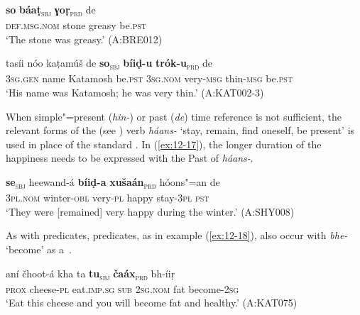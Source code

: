 \begin{exe}
\ex
\label{ex:12-15}
\gll {\ob}\textbf{so} \textbf{báaṭ}{\cb}\textsubscript{\textsc{\upshape sbj}} {\ob}\textbf{ɣoṛ}{\cb}\textsubscript{\textsc{\upshape prd}} de \\
\textsc{def.msg.nom} stone greasy be.\textsc{pst} \\
\glt `The stone was greasy.' (A:BRE012)
\end{exe}
\begin{exe}
\ex
\label{ex:12-16}
\gll tasíi nóo kaṭamúš de {\ob}\textbf{so}{\cb}\textsubscript{\textsc{\upshape sbj}} {\ob}\textbf{bíiḍ-u} \textbf{trók-u}{\cb}\textsubscript{\textsc{\upshape prd}} de\\
\textsc{3sg.gen} name Katamosh be.\textsc{pst} \textsc{3sg.nom} very-\textsc{msg} thin-\textsc{msg} be.\textsc{pst}\\
\glt `His name was Katamosh; he was very thin.' (A:KAT002-3)
\end{exe}

When simple"=present (\textit{hin-}) or past (\textit{de}) time reference is not sufficient, the relevant forms of the  (see ) verb \textit{háans-} `stay, remain, find oneself, be present' is used in place of the standard . In (\ref{ex:12-17}), the longer duration of the happiness needs to be expressed with the Past  of \textit{háans-}.

\begin{exe}
\ex
\label{ex:12-17}
\gll {\ob}\textbf{se}{\cb}\textsubscript{\textsc{\upshape sbj}} heewand-á {\ob}\textbf{bíiḍ-a} \textbf{xušaán}{\cb}\textsubscript{\textsc{\upshape prd}} hóons"=an de \\
\textsc{3pl.nom} winter-\textsc{obl} very-\textsc{pl} happy stay-\textsc{3pl} \textsc{pst} \\
\glt `They were [remained] very happy during the winter.' (A:SHY008)
\end{exe}

As with   predicates,   predicates, as in example (\ref{ex:12-18}), also occur with \textit{bhe-} `become' as a~.

\begin{exe}
\ex
\label{ex:12-18}
\gll aní čhoot-á kha ta {\ob}\textbf{tu}{\cb}\textsubscript{\textsc{\upshape sbj}} {\ob}\textbf{čaáx}{\cb}\textsubscript{\textsc{\upshape prd}} bh-íiṛ \\
\textsc{prox} cheese-\textsc{pl} eat.\textsc{imp.sg} \textsc{sub} \textsc{2sg.nom} fat become-\textsc{2sg} \\
\glt `Eat this cheese and you will become fat and healthy.' (A:KAT075)
\end{exe}

